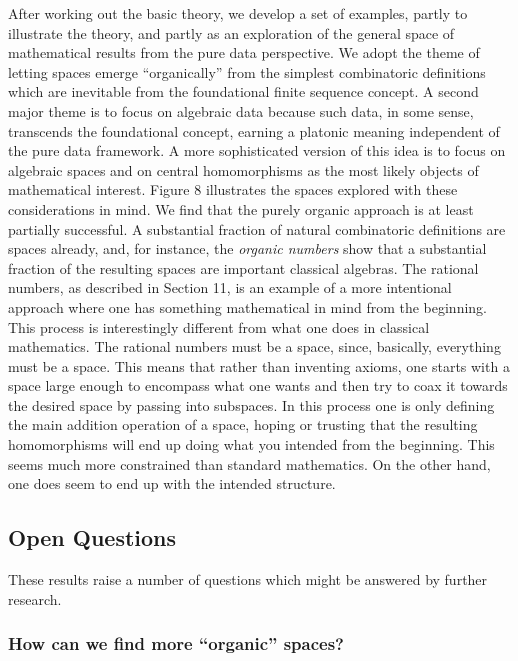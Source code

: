 \documentclass[11pt]{article}
\begin{document}
     After working out the basic theory, we develop a set of examples, partly to illustrate the theory, and partly as an exploration of the general 
space of mathematical results from the pure data perspective.  We adopt the theme of letting spaces emerge ``organically'' from the simplest 
combinatoric definitions which are inevitable from the foundational finite sequence concept.  
A second major theme is to focus on algebraic data because such data, in some sense, transcends 
the foundational concept, earning a platonic meaning independent of the pure data framework.  A more 
sophisticated version of this idea is to focus on algebraic spaces and on central homomorphisms as the most likely objects 
of mathematical interest. 
Figure 8 illustrates the spaces explored with these considerations in mind.  
We find that the purely organic approach is at least partially successful.  A substantial fraction of natural combinatoric definitions are 
spaces already, and, for instance, the {\it organic numbers} show that a substantial fraction of the resulting spaces are important classical algebras.  
The rational numbers, as described in Section 11, is an example of a more intentional approach where one has something mathematical
in mind from the beginning.  This process is interestingly different from what one does in classical mathematics.  The rational numbers 
must be a space, since, basically, everything must be a space.  This means that rather than inventing axioms, one starts with a space 
large enough to encompass what one wants and then try to coax it towards the desired space by passing into subspaces.  In this 
process one is only defining the main addition operation of a space, hoping or trusting that the resulting homomorphisms will end up 
doing what you intended from the beginning.  This seems much more constrained than standard mathematics.  On the other hand, 
one does seem to end up with the intended structure.  

\subsection{Open Questions}

These results raise a number of questions which might be answered by further research.  

\subsubsection{How can we find more ``organic'' spaces?}
\end{document}
